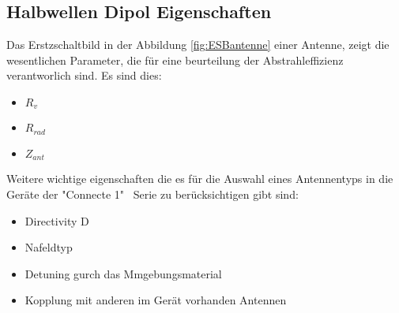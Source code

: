 \subsection{Halbwellen Dipol Eigenschaften}
Das Erstzschaltbild in der Abbildung \ref{fig:ESBantenne} einer Antenne, zeigt die wesentlichen Parameter, die für eine beurteilung der Abstrahleffizienz verantworlich sind. Es sind dies:
\begin{itemize}
\item $R_{v}$
\item $R_{rad}$
\item $Z_{ant}$
\end{itemize}

Weitere wichtige eigenschaften die es für die Auswahl eines Antennentyps in die Geräte der "Connecte 1" \  Serie zu berücksichtigen gibt sind:
\begin{itemize}
\item Directivity D
\item Nafeldtyp
\item Detuning gurch das Mmgebungsmaterial
\item Kopplung mit anderen im Gerät vorhanden Antennen
\end{itemize}

